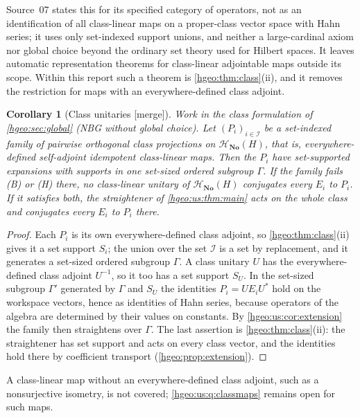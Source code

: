\documentclass[11pt,letterpaper]{article}
\numberwithin{equation}{section}
\newtheorem{corollary}[corollary]{Corollary}
\theoremstyle{definition}
\theoremstyle{remark}
\newcommand{\No}{\mathbf{No}}
\newcommand{\mergetag}{\textup{\textsf{\small[merge]}}}
\begin{document}
Source~07 states this for its specified category of operators, not as an
identification of all class-linear maps on a proper-class vector space with
Hahn series; it uses only set-indexed support unions, and neither a
large-cardinal axiom nor global choice beyond the ordinary set theory used for
Hilbert spaces. It leaves automatic representation theorems for class-linear
adjointable maps outside its scope. Within this report such a theorem is
\cref{hgeo:thm:class}(ii), and it removes the restriction for maps with an
everywhere-defined class adjoint.

\begin{corollary}[Class unitaries \mergetag]\label{hgeo:us:cor:classmaps}
Work in the class formulation of \cref{hgeo:sec:global} (NBG without global
choice). Let $(P_i)_{i\in\mathcal I}$ be a set-indexed family of pairwise
orthogonal class projections on $\mathscr H_{\No}(H)$, that is,
everywhere-defined self-adjoint idempotent class-linear maps. Then the
$P_i$ have set-supported expansions with supports in one set-sized
ordered subgroup $\Gamma$. If the family fails \textup{(B)} or \textup{(H)}
there, no class-linear unitary of $\mathscr H_{\No}(H)$ conjugates every $E_i$
to $P_i$. If it satisfies both, the straightener of \cref{hgeo:us:thm:main}
acts on the whole class and conjugates every $E_i$ to $P_i$ there.
\end{corollary}
\begin{proof}
Each $P_i$ is its own everywhere-defined class adjoint, so
\cref{hgeo:thm:class}(ii) gives it a set support $S_i$; the union over the set
$\mathcal I$ is a set by replacement, and it generates a set-sized ordered
subgroup $\Gamma$. A class unitary $U$ has the everywhere-defined class
adjoint $U^{-1}$, so it too has a set support $S_U$. In the set-sized subgroup
$\Gamma'$ generated by $\Gamma$ and $S_U$ the identities $P_i=UE_iU^*$ hold on
the workspace vectors, hence as identities of Hahn series, because operators
of the algebra are determined by their values on constants. By
\cref{hgeo:us:cor:extension} the family then straightens over $\Gamma$. The
last assertion is \cref{hgeo:thm:class}(ii): the straightener has set support
and acts on every class vector, and the identities hold there by coefficient
transport (\cref{hgeo:prop:extension}).
\end{proof}

A class-linear map without an everywhere-defined class adjoint, such as a
nonsurjective isometry, is not covered; \cref{hgeo:us:q:classmaps} remains
open for such maps.
\end{document}
